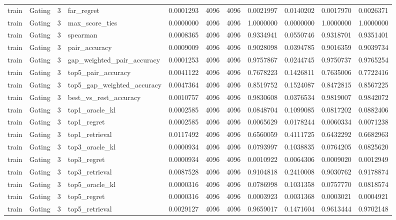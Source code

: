 \begin{tabular}{llrlrrrrrrr}
train & Gating & 3 & far_regret & 0.0001293 & 4096 & 4096 & 0.0021997 & 0.0140202 & 0.0017970 & 0.0026371 \\
train & Gating & 3 & max_score_ties & 0.0000000 & 4096 & 4096 & 1.0000000 & 0.0000000 & 1.0000000 & 1.0000000 \\
train & Gating & 3 & spearman & 0.0008365 & 4096 & 4096 & 0.9334941 & 0.0550746 & 0.9318701 & 0.9351401 \\
train & Gating & 3 & pair_accuracy & 0.0009009 & 4096 & 4096 & 0.9028098 & 0.0394785 & 0.9016359 & 0.9039734 \\
train & Gating & 3 & gap_weighted_pair_accuracy & 0.0001253 & 4096 & 4096 & 0.9757867 & 0.0244745 & 0.9750737 & 0.9765254 \\
train & Gating & 3 & top5_pair_accuracy & 0.0041122 & 4096 & 4096 & 0.7678223 & 0.1426811 & 0.7635006 & 0.7722416 \\
train & Gating & 3 & top5_gap_weighted_accuracy & 0.0047364 & 4096 & 4096 & 0.8519752 & 0.1524087 & 0.8472815 & 0.8567225 \\
train & Gating & 3 & best_vs_rest_accuracy & 0.0010757 & 4096 & 4096 & 0.9830608 & 0.0376534 & 0.9819007 & 0.9842072 \\
train & Gating & 3 & top1_oracle_kl & 0.0002585 & 4096 & 4096 & 0.0848704 & 0.1099085 & 0.0817202 & 0.0882406 \\
train & Gating & 3 & top1_regret & 0.0002585 & 4096 & 4096 & 0.0065629 & 0.0178244 & 0.0060334 & 0.0071238 \\
train & Gating & 3 & top1_retrieval & 0.0117492 & 4096 & 4096 & 0.6560059 & 0.4111725 & 0.6432292 & 0.6682963 \\
train & Gating & 3 & top3_oracle_kl & 0.0000934 & 4096 & 4096 & 0.0793997 & 0.1038835 & 0.0764205 & 0.0825620 \\
train & Gating & 3 & top3_regret & 0.0000934 & 4096 & 4096 & 0.0010922 & 0.0064306 & 0.0009020 & 0.0012949 \\
train & Gating & 3 & top3_retrieval & 0.0087528 & 4096 & 4096 & 0.9104818 & 0.2410008 & 0.9030762 & 0.9178874 \\
train & Gating & 3 & top5_oracle_kl & 0.0000316 & 4096 & 4096 & 0.0786998 & 0.1031358 & 0.0757770 & 0.0818574 \\
train & Gating & 3 & top5_regret & 0.0000316 & 4096 & 4096 & 0.0003923 & 0.0031368 & 0.0003021 & 0.0004921 \\
train & Gating & 3 & top5_retrieval & 0.0029127 & 4096 & 4096 & 0.9659017 & 0.1471604 & 0.9613444 & 0.9702148 \\

\end{tabular}
